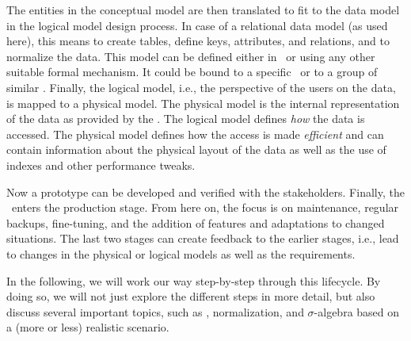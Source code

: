 The entities in the conceptual model are then translated to fit to the data model in the logical model design process.
In case of a relational data model (as used here), this means to create tables, define keys, attributes, and relations, and to normalize the data.
This model can be defined either in \sql\ or using any other suitable formal mechanism.
It could be bound to a specific \dbms\ or to a group of similar .
Finally, the logical model, i.e., the perspective of the users on the data, is mapped to a physical model.
The physical model is the internal representation of the data as provided by the \dbms.
The logical model defines \emph{how} the data is accessed.
The physical model defines how the access is made \emph{efficient} and can contain information about the physical layout of the data as well as the use of indexes and other performance tweaks.

Now a prototype can be developed and verified with the stakeholders.
Finally, the \db\ enters the production stage.
From here on, the focus is on maintenance, regular backups, fine-tuning, and the addition of features and adaptations to changed situations.
The last two stages can create feedback to the earlier stages, i.e., lead to changes in the physical or logical models as well as the requirements.

In the following, we will work our way step-by-step through this lifecycle.
By doing so, we will not just explore the different steps in more detail, but also discuss several important topics, such as , normalization, and $\sigma$\nobreakdashes-algebra based on a (more or less) realistic scenario.%
%
\FloatBarrier%
\endhsection%
%
\endhsection%
%

